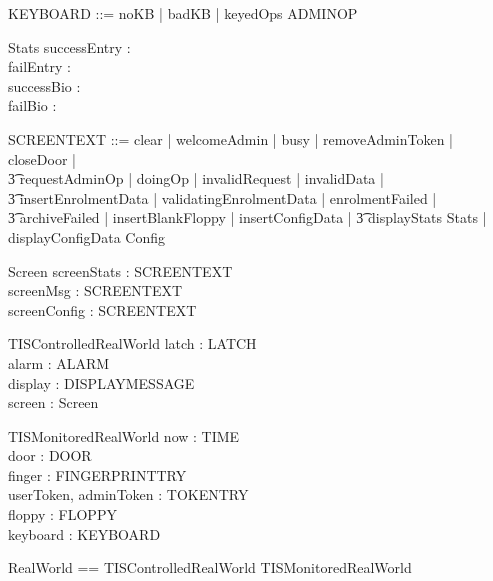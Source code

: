 \begin{zed}
        KEYBOARD ::= noKB | badKB | keyedOps \ldata ADMINOP \rdata 
\end{zed}

\begin{schema}{Stats} 
        successEntry : \nat
\\      failEntry : \nat
\\      successBio : \nat
\\      failBio : \nat
\end{schema}

\begin{zed}
       SCREENTEXT ::= clear | welcomeAdmin | busy | removeAdminToken |
       closeDoor |
\\ \t3          requestAdminOp | doingOp | invalidRequest | invalidData |
\\ \t3          insertEnrolmentData | validatingEnrolmentData |
       enrolmentFailed |
\\ \t3          archiveFailed | insertBlankFloppy | insertConfigData |
\also 
        \t3  displayStats \ldata Stats \rdata | 
        displayConfigData \ldata Config \rdata
\end{zed}

\begin{schema}{Screen}
        screenStats : SCREENTEXT
\\      screenMsg : SCREENTEXT
\\      screenConfig : SCREENTEXT 
\end{schema}

\begin{schema}{TISControlledRealWorld}
        latch : LATCH
\\      alarm : ALARM
\\      display : DISPLAYMESSAGE
\\      screen : Screen
\end{schema}

\begin{schema}{TISMonitoredRealWorld}
        now : TIME
\\      door : DOOR
\\      finger : FINGERPRINTTRY
\\      userToken, adminToken : TOKENTRY
\\      floppy : FLOPPY
\\      keyboard : KEYBOARD
\end{schema}

\begin{zed}
RealWorld == TISControlledRealWorld \land TISMonitoredRealWorld
\end{zed}

